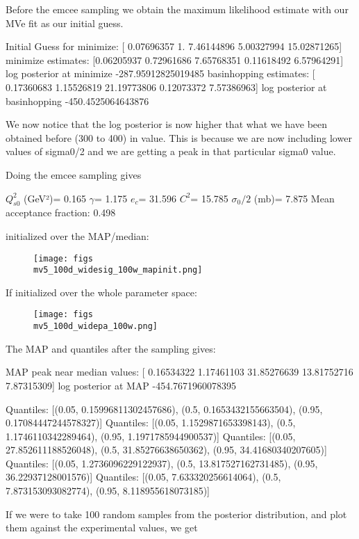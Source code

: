 \documentclass{article}
\begin{document}
Before the emcee sampling we obtain the maximum likelihood estimate with our MVe fit as our initial guess. 

Initial Guess for minimize:  [ 0.07696357  1.          7.46144896  5.00327994 15.02871265]
minimize estimates:  [0.06205937 0.72961686 7.65768351 0.11618492 6.57964291]
log posterior at minimize -287.95912825019485
basinhopping estimates:  [ 0.17360683  1.15526819 21.19773806  0.12073372  7.57386963]
log posterior at basinhopping -450.4525064643876

We now notice that the log posterior is now higher that what we have been obtained before (300 to 400) in value. This is because we are now including lower values of sigma0/2 and we are getting a peak in that particular sigma0 value.

Doing the emcee sampling gives

$Q_{s0}^{2}$ (GeV²)= 0.165
$\gamma$= 1.175
$e_c$= 31.596
$C^{2}$= 15.785
$\sigma_0/2$ (mb)= 7.875
Mean acceptance fraction: 0.498

initialized over the MAP/median:

\begin{figure}
\centering
\texttt{[image: figs\\mv5\_100d\_widesig\_100w\_mapinit.png]}
\label{fig:mv5_100d_widesig_100w_mapinit}
\end{figure}

If initialized over the whole parameter space:
\begin{figure}
\centering
\texttt{[image: figs\\mv5\_100d\_widepa\_100w.png]}
\end{figure}

The MAP and quantiles after the sampling gives:

MAP peak near median values: [ 0.16534322  1.17461103 31.85276639 13.81752716  7.87315309]
log posterior at MAP -454.7671960078395

Quantiles:
[(0.05, 0.15996811302457686), (0.5, 0.1653432155663504), (0.95, 0.17084447244578327)]
Quantiles:
[(0.05, 1.1529871653398143), (0.5, 1.1746110342289464), (0.95, 1.1971785944900537)]
Quantiles:
[(0.05, 27.852611188526048), (0.5, 31.85276638650362), (0.95, 34.41680340207605)]
Quantiles:
[(0.05, 1.2736096229122937), (0.5, 13.817527162731485), (0.95, 36.22937128001576)]
Quantiles:
[(0.05, 7.633320256614064), (0.5, 7.873153093082774), (0.95, 8.118955618073185)]


If we were to take 100 random samples from the posterior distribution, and plot them against the experimental values, we get
\end{document}
